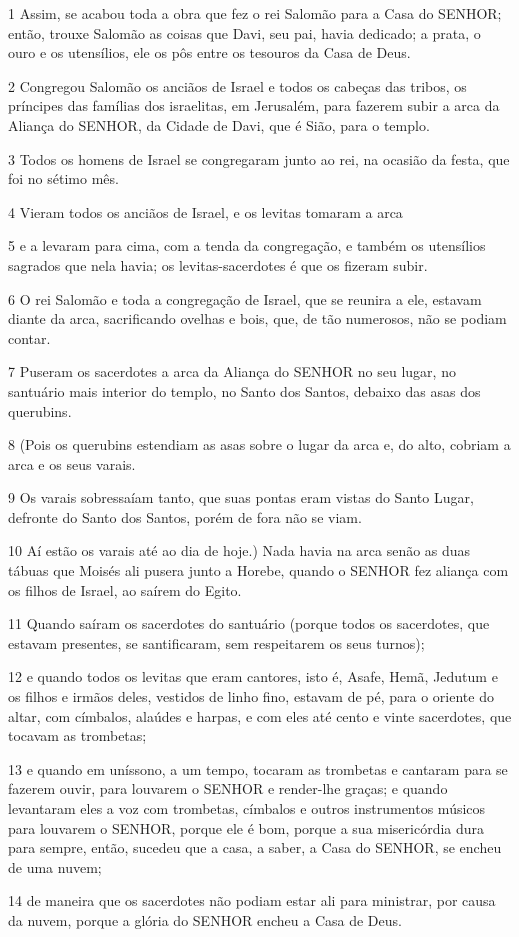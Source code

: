 \par 1 Assim, se acabou toda a obra que fez o rei Salomão para a Casa do SENHOR; então, trouxe Salomão as coisas que Davi, seu pai, havia dedicado; a prata, o ouro e os utensílios, ele os pôs entre os tesouros da Casa de Deus.
\par 2 Congregou Salomão os anciãos de Israel e todos os cabeças das tribos, os príncipes das famílias dos israelitas, em Jerusalém, para fazerem subir a arca da Aliança do SENHOR, da Cidade de Davi, que é Sião, para o templo.
\par 3 Todos os homens de Israel se congregaram junto ao rei, na ocasião da festa, que foi no sétimo mês.
\par 4 Vieram todos os anciãos de Israel, e os levitas tomaram a arca
\par 5 e a levaram para cima, com a tenda da congregação, e também os utensílios sagrados que nela havia; os levitas-sacerdotes é que os fizeram subir.
\par 6 O rei Salomão e toda a congregação de Israel, que se reunira a ele, estavam diante da arca, sacrificando ovelhas e bois, que, de tão numerosos, não se podiam contar.
\par 7 Puseram os sacerdotes a arca da Aliança do SENHOR no seu lugar, no santuário mais interior do templo, no Santo dos Santos, debaixo das asas dos querubins.
\par 8 (Pois os querubins estendiam as asas sobre o lugar da arca e, do alto, cobriam a arca e os seus varais.
\par 9 Os varais sobressaíam tanto, que suas pontas eram vistas do Santo Lugar, defronte do Santo dos Santos, porém de fora não se viam.
\par 10 Aí estão os varais até ao dia de hoje.) Nada havia na arca senão as duas tábuas que Moisés ali pusera junto a Horebe, quando o SENHOR fez aliança com os filhos de Israel, ao saírem do Egito.
\par 11 Quando saíram os sacerdotes do santuário (porque todos os sacerdotes, que estavam presentes, se santificaram, sem respeitarem os seus turnos);
\par 12 e quando todos os levitas que eram cantores, isto é, Asafe, Hemã, Jedutum e os filhos e irmãos deles, vestidos de linho fino, estavam de pé, para o oriente do altar, com címbalos, alaúdes e harpas, e com eles até cento e vinte sacerdotes, que tocavam as trombetas;
\par 13 e quando em uníssono, a um tempo, tocaram as trombetas e cantaram para se fazerem ouvir, para louvarem o SENHOR e render-lhe graças; e quando levantaram eles a voz com trombetas, címbalos e outros instrumentos músicos para louvarem o SENHOR, porque ele é bom, porque a sua misericórdia dura para sempre, então, sucedeu que a casa, a saber, a Casa do SENHOR, se encheu de uma nuvem;
\par 14 de maneira que os sacerdotes não podiam estar ali para ministrar, por causa da nuvem, porque a glória do SENHOR encheu a Casa de Deus.

